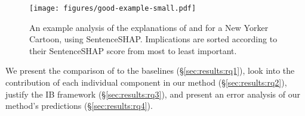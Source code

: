 





\begin{figure}[t]
  \texttt{[image: figures/good-example-small.pdf]} \hfill
  \vspace{-10pt}
  \caption{An example analysis of the explanations of \base{} and \method{} for a New Yorker Cartoon, using SentenceSHAP. Implications are sorted according to their SentenceSHAP score from most to least important.}
  \label{fig:shap-example}
\end{figure}

We present the comparison of \method{} to the baselines (\S\ref{sec:results:rq1}), look into the contribution of each individual component in our method (\S\ref{sec:results:rq2}), justify the IB framework (\S\ref{sec:results:rq3}), and present an error analysis of our method's predictions  (\S\ref{sec:results:rq4}).  



